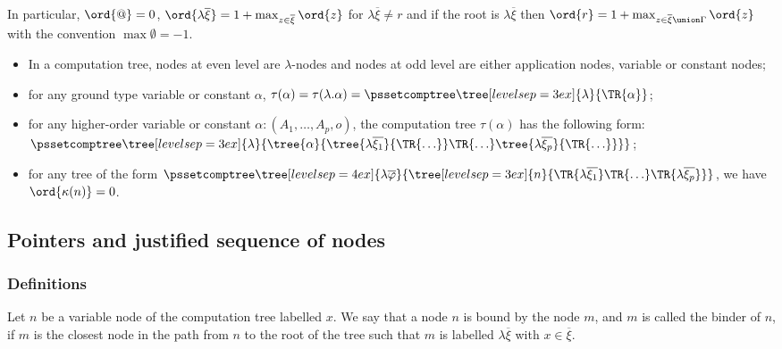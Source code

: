In particular, $\ord{@} = 0$, $\ord{\lambda \overline{\xi}} = 1+
\max_{z\in \overline{\xi}} \ord{z}$ for $\lambda \overline{\xi}\neq
r$ and if the root is $\lambda \overline{\xi}$ then $\ord{r} = 1 + \max_{z\in
\overline{\xi}\union \Gamma} \ord{z}$ with the convention $\max
\emptyset = -1$.

\begin{remark} \hfill
\begin{itemize}
\item In a computation tree, nodes at even level are $\lambda$-nodes and nodes at odd level are either application nodes,
variable or constant nodes;

\item for any ground type variable or constant $\alpha$,
$\tau(\alpha) = \tau(\lambda . \alpha) =
\pssetcomptree\tree[levelsep=3ex]{\lambda}{ \TR{\alpha} }$;

\item for any higher-order variable or constant $\alpha : (A_1,\ldots,A_p,o)$, the computation tree $\tau(\alpha)$ has the following form:
$ \pssetcomptree\tree[levelsep=3ex]{\lambda}{\tree{\alpha} {
                \tree{\lambda \overline{\xi_1}}{\TR{\ldots}}
                \TR{\ldots} \tree{\lambda
                \overline{\xi_p}}{\TR{\ldots}} }
        }
$;

\item for any tree of the form
        $ \pssetcomptree\tree[levelsep=4ex]{\lambda
            \overline{\varphi}} { \tree[levelsep=3ex]{n}
            {\TR{\lambda
                \overline{\xi_1}} \TR{\ldots} \TR{\lambda
                \overline{\xi_p}}}
            }
        $,
    we have $\ord{\kappa(n)}=0$.

\end{itemize}
\end{remark}


\subsection{Pointers and justified sequence of nodes}
\subsubsection{Definitions}
\begin{definition}[Binder]
Let $n$ be a variable node of the computation tree labelled $x$. We
say that a node $n$ is bound by the node $m$, and $m$ is called the
binder of $n$, if $m$ is the closest node in the path from $n$ to
the root of the tree such that $m$ is labelled $\lambda
\overline{\xi}$ with $x\in \overline{\xi}$.
\end{definition}

